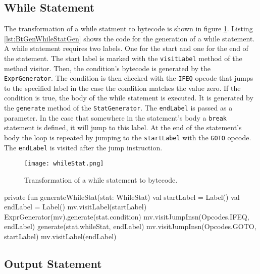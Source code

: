 \subsection{While Statement}

The transformation of a while statment to bytecode is shown in figure \ref{fig:WhileStat}. Listing \ref{lst:BtGenWhileStatGen} shows the code for the generation of a while statement. A while statement requires two labels. One for the start and one for the end of the statement. The start label is marked with the \verb|visitLabel| method of the method visitor. Then, the condition's bytecode is generated by the \verb|ExprGenerator|. The condition is then checked with the \verb|IFEQ| opcode that jumps to the specified label in the case the condition matches the value zero. If the condition is true, the body of the while statement is executed. It is generated by the \verb|generate| method of the \verb|StatGenerator|. The \verb|endLabel| is passed as a parameter. In the case that somewhere in the statement's body a \verb|break| statement is defined, it will jump to this label. At the end of the statement's body the loop is repeated by jumping to the \verb|startLabel| with the \verb|GOTO| opcode. The \verb|endLabel| is visited after the jump instruction. 

\begin{figure}[]
    \centering
    \texttt{[image: whileStat.png]}
    \caption{Transformation of a while statement to bytecode.}
    \label{fig:WhileStat}
\end{figure}

\begin{KotlinCode}[float,numbers=none,caption=Implementation of the \texttt{generateInputStat} method of the \texttt{StatGenerator}., label=lst:BtGenWhileStatGen]
private fun generateWhileStat(stat: WhileStat) {
    val startLabel = Label()
    val endLabel = Label()
    mv.visitLabel(startLabel)
    ExprGenerator(mv).generate(stat.condition)
    mv.visitJumpInsn(Opcodes.IFEQ, endLabel)
    generate(stat.whileStat, endLabel)
    mv.visitJumpInsn(Opcodes.GOTO, startLabel)
    mv.visitLabel(endLabel)
}
    \end{KotlinCode}

\subsection{Output Statement}

